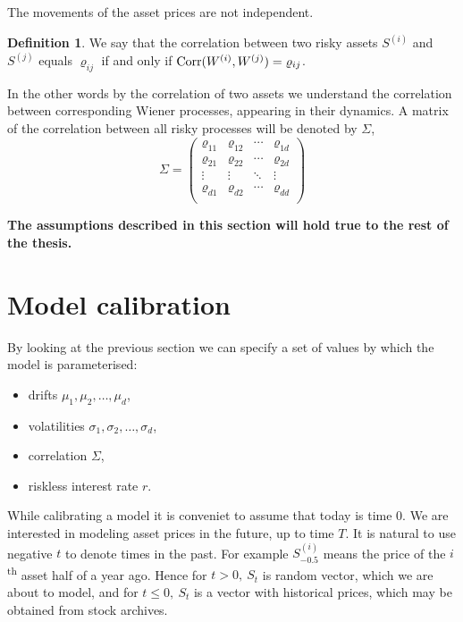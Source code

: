 \documentclass[a4paper,12pt, oneside]{book}
\theoremstyle{definition}
\newtheorem{mydef}{Definition}[chapter]
\theoremstyle{remark}
\def\Corr{{\hbox{Corr}}}
\begin{document}
The movements of the asset prices are not independent.
\begin{mydef}
 We say that the correlation between two risky assets $S^{(i)}$ and $S^{(j)}$ equals $\varrho_{ij}$ if and only if $\Corr(W^{(i)}, W^{(j)}) = \varrho_{ij}$.
\end{mydef}
In the other words by the correlation of two assets we understand the correlation between corresponding Wiener processes, appearing in their dynamics. A matrix of the correlation between all risky processes will be denoted by $\Sigma$,
\begin{equation*}
 \Sigma = \left( \begin{array}{cccc}
           \varrho_{11} & \varrho_{12} & \cdots & \varrho_{1d} \\
           \varrho_{21} & \varrho_{22} & \cdots & \varrho_{2d} \\
           \vdots & \vdots & \ddots & \vdots \\
           \varrho_{d1} & \varrho_{d2} & \cdots & \varrho_{dd} \\
          \end{array} \right)
\end{equation*}

\textbf{The assumptions described in this section will hold true to the rest of the thesis.}

\section{Model calibration}
By looking at the previous section we can specify a set of values by which the model is parameterised:
\begin{itemize}
 \item drifts $\mu_1, \mu_2, \ldots, \mu_d$,
 \item volatilities $\sigma_1, \sigma_2, \ldots, \sigma_d$,
 \item correlation $\Sigma$,
 \item riskless interest rate $r$.
\end{itemize}
While calibrating a model it is conveniet to assume that today is time $0$. We are interested in modeling asset prices in the future, up to time $T$. It is natural to use negative $t$ to denote times in the past. For example $S^{(i)}_{-0.5}$ means the price of the $i$\textsuperscript{th} asset half of a year ago. Hence for $t > 0,\ S_t$ is random vector, which we are about to model, and for $t \leq 0,\ S_t$ is a vector with historical prices, which may be obtained from stock archives.
\end{document}
